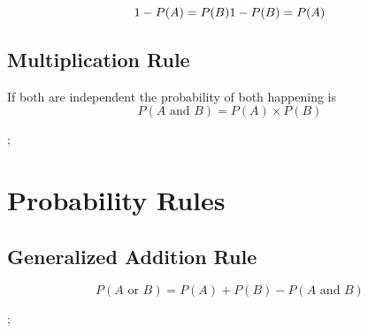 \documentclass[11pt]{article}
\begin{document}
\begin{equation}
    1-P(A)=P(B) \\
    1-P(B)=P(A)
\end{equation}

\subsection*{Multiplication Rule}
If both are independent the probability of both happening is 
\begin{equation}
P(A \text{ and } B)=P(A) \times P(B)
\end{equation}

\pagestyle{empty}
\def\rectangle{(0,0)--(0,4)--(4,4)--(4,0)--cycle}
\def\uncircle{(1,1) circle (1cm)}
\def\deuxcircle{(3,3) circle (1cm)}
\def\troiscircle{ (2,2) circle (1cm)}
;



\newpage
 \section*{Probability Rules}
 \subsection*{Generalized Addition Rule}
 \begin{equation}
 P(A \text{ or } B) = P(A) + P(B) - P(A \text{ and } B)
 \end{equation}


\pagestyle{empty}
\def\rectangledeux{(0,0)--(0,4)--(4,4)--(4,0)--cycle}
\def\circleun{(1,1) circle (1cm)}
\def\circledeux{(2,2) circle (1cm)}
;
\end{document}
